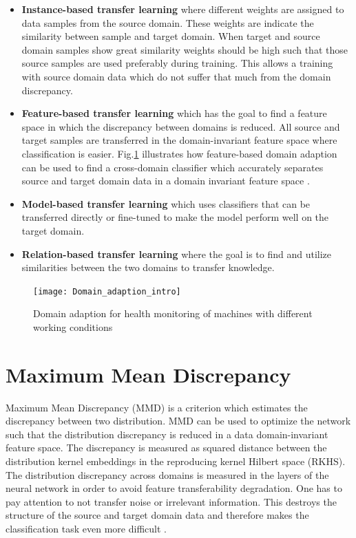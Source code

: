 \begin{itemize}
\item \textbf{Instance-based transfer learning} where different weights are assigned to data samples from the source domain. These weights are indicate the similarity between sample and target domain. When target and source domain samples show great similarity weights should be high such that those source samples are used preferably during training. This allows a training with source domain data which do not suffer that much from the domain discrepancy. 
\item \textbf{Feature-based transfer learning} which has the goal to find a feature space in which the discrepancy between domains is reduced. All source and target samples are transferred in the domain-invariant feature space where classification is easier. Fig.\ref{fig:Domain_adaption_intro} illustrates how feature-based domain adaption can be used to find a cross-domain classifier which accurately separates source and target domain data in a domain invariant feature space \cite{Pandhare2021}. 
\item \textbf{Model-based transfer learning} which uses classifiers that can be transferred directly or fine-tuned to make the model perform well on the target domain.
\item \textbf{Relation-based transfer learning} where the goal is to find and utilize similarities between the two domains to transfer knowledge. 
\end{itemize}


\begin{figure}[htpb]
  \centering
  \texttt{[image: Domain\_adaption\_intro]}
  \caption {Domain adaption for health monitoring of machines with different working conditions \cite{Pandhare2021}} \label{fig:Domain_adaption_intro}
\end{figure}
\FloatBarrier 



\section{Maximum Mean Discrepancy}
Maximum Mean Discrepancy (MMD) is a criterion which estimates the discrepancy between two distribution. MMD can be used to optimize the network such that the distribution discrepancy is reduced in a data domain-invariant feature space. The discrepancy is measured as squared distance between the distribution kernel embeddings in the reproducing kernel Hilbert space (RKHS). The distribution discrepancy across domains is measured in the layers of the neural network in order to avoid feature transferability degradation. One has to pay attention to not transfer noise or irrelevant information. This destroys the structure of the source and target domain data and therefore makes the classification task even more difficult \cite{li2020domain}. 


